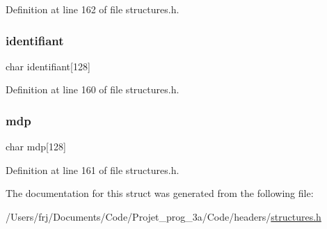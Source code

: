 Definition at line 162 of file structures.\+h.

\hypertarget{structutilisateur_aa9f89c9a3512c982fed4d4789019bdb3}{}\label{structutilisateur_aa9f89c9a3512c982fed4d4789019bdb3} 
\subsubsection{\texorpdfstring{identifiant}{identifiant}}
{\footnotesize\ttfamily char identifiant\mbox{[}128\mbox{]}}



Definition at line 160 of file structures.\+h.

\hypertarget{structutilisateur_a8af71e7f7d7c4089896f8f6498d53a22}{}\label{structutilisateur_a8af71e7f7d7c4089896f8f6498d53a22} 
\subsubsection{\texorpdfstring{mdp}{mdp}}
{\footnotesize\ttfamily char mdp\mbox{[}128\mbox{]}}



Definition at line 161 of file structures.\+h.



The documentation for this struct was generated from the following file\+:\begin{DoxyCompactItemize}
\item 
/\+Users/frj/\+Documents/\+Code/\+Projet\+\_\+prog\+\_\+3a/\+Code/headers/\hyperlink{structures_8h}{structures.\+h}\end{DoxyCompactItemize}
